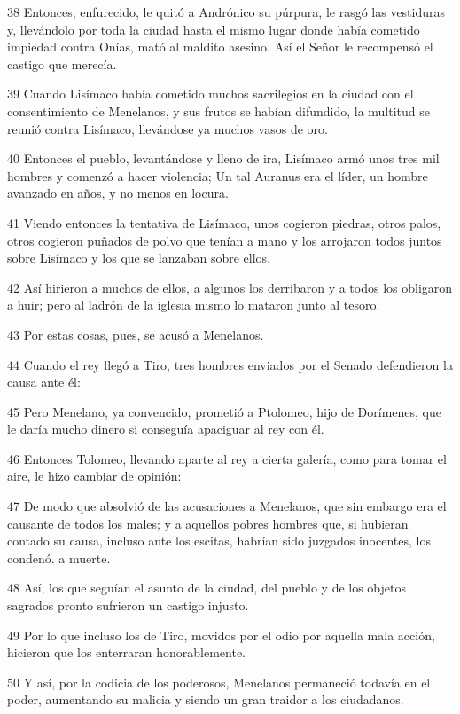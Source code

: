 \par 38 Entonces, enfurecido, le quitó a Andrónico su púrpura, le rasgó las vestiduras y, llevándolo por toda la ciudad hasta el mismo lugar donde había cometido impiedad contra Onías, mató al maldito asesino. Así el Señor le recompensó el castigo que merecía.
\par 39 Cuando Lisímaco había cometido muchos sacrilegios en la ciudad con el consentimiento de Menelanos, y sus frutos se habían difundido, la multitud se reunió contra Lisímaco, llevándose ya muchos vasos de oro.
\par 40 Entonces el pueblo, levantándose y lleno de ira, Lisímaco armó unos tres mil hombres y comenzó a hacer violencia; Un tal Auranus era el líder, un hombre avanzado en años, y no menos en locura.
\par 41 Viendo entonces la tentativa de Lisímaco, unos cogieron piedras, otros palos, otros cogieron puñados de polvo que tenían a mano y los arrojaron todos juntos sobre Lisímaco y los que se lanzaban sobre ellos.
\par 42 Así hirieron a muchos de ellos, a algunos los derribaron y a todos los obligaron a huir; pero al ladrón de la iglesia mismo lo mataron junto al tesoro.
\par 43 Por estas cosas, pues, se acusó a Menelanos.
\par 44 Cuando el rey llegó a Tiro, tres hombres enviados por el Senado defendieron la causa ante él:
\par 45 Pero Menelano, ya convencido, prometió a Ptolomeo, hijo de Dorímenes, que le daría mucho dinero si conseguía apaciguar al rey con él.
\par 46 Entonces Tolomeo, llevando aparte al rey a cierta galería, como para tomar el aire, le hizo cambiar de opinión:
\par 47 De modo que absolvió de las acusaciones a Menelanos, que sin embargo era el causante de todos los males; y a aquellos pobres hombres que, si hubieran contado su causa, incluso ante los escitas, habrían sido juzgados inocentes, los condenó. a muerte.
\par 48 Así, los que seguían el asunto de la ciudad, del pueblo y de los objetos sagrados pronto sufrieron un castigo injusto.
\par 49 Por lo que incluso los de Tiro, movidos por el odio por aquella mala acción, hicieron que los enterraran honorablemente.
\par 50 Y así, por la codicia de los poderosos, Menelanos permaneció todavía en el poder, aumentando su malicia y siendo un gran traidor a los ciudadanos.

